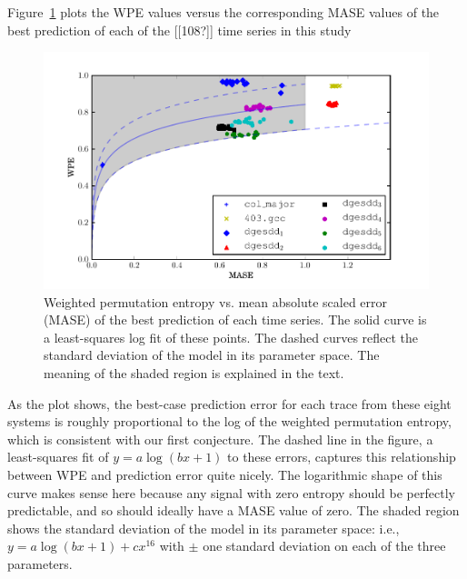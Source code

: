 Figure~\ref{fig:wpe_vs_mase_best} plots the WPE values versus the
corresponding MASE values of the best prediction of each of the
\alert{[[108?]]} time series in this study
\begin{figure}[htbp]
  \centering
  \includegraphics[width=\columnwidth]{figs/new_prediction_vs_entropy}
  \caption{Weighted permutation entropy vs. mean absolute scaled error
    (MASE) of the best prediction of each time series.
%
%
The solid curve is a least-squares log fit of these points.
% 
% 
The dashed curves reflect the standard deviation of the model in its
parameter space.  The meaning of the shaded region is explained in the
text.}
  \label{fig:wpe_vs_mase_best}
\end{figure}
\alert{As the plot shows, the best-case prediction error for each trace from
these eight systems is roughly proportional to the log of the weighted
permutation entropy, which is consistent with our first conjecture.}
The dashed line in the figure, a least-squares fit of $y = a \log(b x
+ 1)$ to these errors,
% 
% 
captures this relationship between WPE and prediction error quite
nicely.  The logarithmic shape of this curve makes sense here because
any signal with zero entropy should be perfectly predictable, and so
should ideally have a MASE value of zero.  The shaded region shows the
standard deviation of the model in its parameter space: i.e., $y = a
\log(b x + 1) + c x^{16}$ with $\pm$ one standard deviation on each of
the three parameters.

